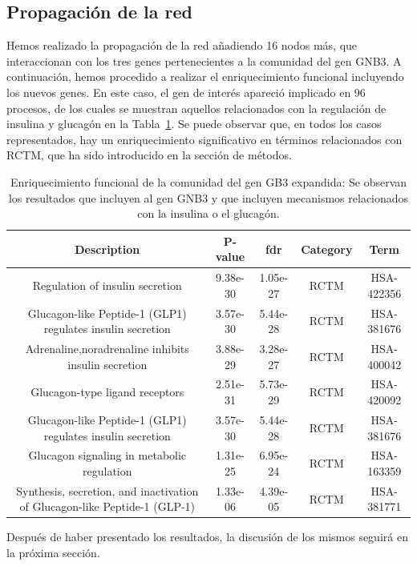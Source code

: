 \subsection{Propagación de la red}

Hemos realizado la propagación de la red añadiendo 16 nodos más, que interaccionan con los tres genes pertenecientes a la comunidad del gen GNB3. A continuación, hemos procedido a realizar el enriquecimiento funcional incluyendo los nuevos genes. En este caso, el gen de interés apareció implicado en 96 procesos, de los cuales se muestran aquellos relacionados con la regulación de insulina y glucagón en la Tabla~\ref{table:enriquecimiento2}. Se puede observar que, en todos los casos representados, hay un enriquecimiento significativo en términos relacionados con RCTM, que ha sido introducido en la sección de métodos.


\begin{table}[h]
	\centering
	\begin{tabular}{|c|c|c|c|c|}
		\hline
		 Description & P-value & fdr & Category & Term \\ \hline
		 Regulation of insulin secretion   & 9.38e-30 & 1.05e-27 &  RCTM & HSA-422356 \\ \hline
		 Glucagon-like Peptide-1 (GLP1) regulates insulin secretion  & 3.57e-30 & 5.44e-28 &  RCTM & HSA-381676 \\ \hline
		 Adrenaline,noradrenaline inhibits insulin secretion & 3.88e-29 & 3.28e-27 &  RCTM & HSA-400042 \\ \hline
		 Glucagon-type ligand receptors & 2.51e-31 & 5.73e-29 &  RCTM & HSA-420092 \\ \hline
		 Glucagon-like Peptide-1 (GLP1) regulates insulin secretion & 3.57e-30 & 5.44e-28 &  RCTM & HSA-381676 \\ \hline
		 Glucagon signaling in metabolic regulation & 1.31e-25 & 6.95e-24 &  RCTM & HSA-163359 \\ \hline
		 Synthesis, secretion, and inactivation of Glucagon-like Peptide-1 (GLP-1) & 1.33e-06 & 4.39e-05 &  RCTM & HSA-381771 \\ \hline
	\end{tabular}
	\caption{Enriquecimiento funcional de la comunidad del gen GB3 expandida: Se observan los resultados que incluyen al gen GNB3 y que incluyen mecanismos relacionados con la insulina o el glucagón.}
	\label{table:enriquecimiento2}
\end{table}

Después de haber presentado los resultados, la discusión de los mismos seguirá en la próxima sección.
